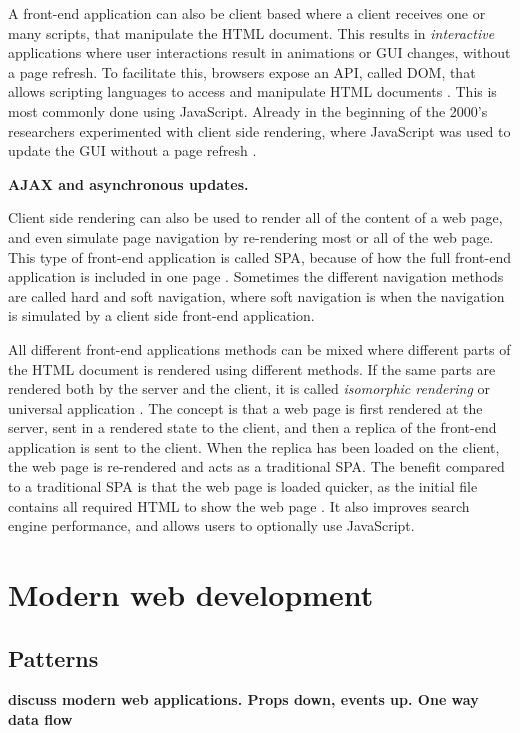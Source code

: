 A front-end application can also be client based where a client receives one or many scripts, that manipulate the \ac{HTML} document. This results in \textit{interactive} applications where user interactions result in animations or GUI changes, without a page refresh. To facilitate this, browsers expose an API, called \ac{DOM}, that allows scripting languages to access and manipulate \ac{HTML} documents \cite{Apparao1998}. This is most commonly done using JavaScript. Already in the beginning of the 2000's researchers experimented with client side rendering, where JavaScript was used to update the \ac{GUI} without a page refresh \cite{Betz2000}.

\textbf{AJAX and asynchronous updates.}

Client side rendering can also be used to render all of the content of a web page, and even simulate page navigation by re-rendering most or all of the web page. This type of front-end application is called \ac{SPA}, because of how the full front-end application is included in one page \cite{Mesbah2007}. Sometimes the different navigation methods are called hard and soft navigation, where soft navigation is when the navigation is simulated by a client side front-end application.

All different front-end applications methods can be mixed where different parts of the \ac{HTML} document is rendered using different methods. If the same parts are rendered both by the server and the client, it is called \textit{isomorphic rendering} \cite{Brehm2013} or universal application \cite{alabes2017isomorphic}. The concept is that a web page is first rendered at the server, sent in a rendered state to the client, and then a replica of the front-end application is sent to the client. When the replica has been loaded on the client, the web page is re-rendered and acts as a traditional \ac{SPA}. The benefit compared to a traditional \ac{SPA} is that the web page is loaded quicker, as the initial file contains all required \ac{HTML} to show the web page \cite{Brehm2013}. It also improves search engine performance, and allows users to optionally use JavaScript\cite{Brehm2013}.

\section{Modern web development}
\subsection{Patterns}
\textbf{discuss modern web applications. Props down, events up. One way data flow}
